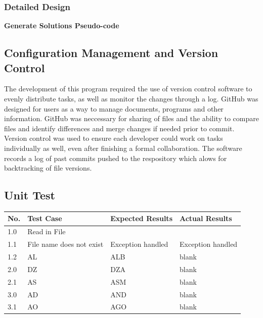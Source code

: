 \documentclass[12pt, a4]{report}
\begin{document}
		
	\subsubsection{Detailed Design}
	
	
	\textbf{Generate Solutions Pseudo-code}
	

	
	\pagebreak
	\subsection{Configuration Management and Version Control}
		\par 
		The development of this program required the use of version control software to evenly distribute tasks, as well as monitor the changes through a log. GitHub was designed for users as a way to manage documents, programs and other information. GitHub was neccessary for sharing of files and the ability to compare files and identify differences and merge changes if needed prior to commit. Version control was used to ensure each developer could work on tasks individually as well, even after finishing a formal collaboration. The software records a log of past commits pushed to the respository which alows for backtracking of file versions.
	
	\subsection{Unit Test}


		\begin{tabular}{ |p{0.5cm}|p{5cm}|p{5cm}|p{5cm}| }
			\hline
			No. & Test Case & Expected Results & Actual Results \\
			\hline
			1.0 & Read in File & & \\
			1.1 & File name does not exist & Exception handled & Exception handled\\
			1.2 &AL & ALB & blank \\
			2.0    &DZ & DZA & blank \\
			2.1 & AS & ASM & blank\\
			3.0 & AD & AND   & blank \\
			3.1 & AO & AGO & blank\\
			\hline
		\end{tabular}
		
\end{document}
